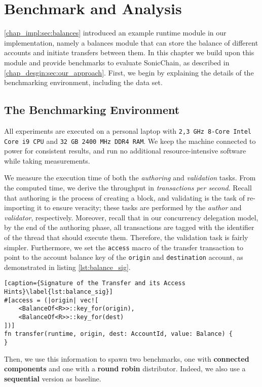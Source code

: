 \chapter{Benchmark and Analysis}  \label{chap:bench_analysis}

\ref{chap_impl:sec:balances} introduced an example runtime module in our implementation, namely a
balances module that can store the balance of different accounts and initiate transfers between
them. In this chapter we build upon this module and provide benchmarks to evaluate SonicChain, as described in \ref{chap_desgin:sec:our_approach}. First, we begin by explaining the details of the
benchmarking environment, including the data set.

\section{The Benchmarking Environment}

All experiments are executed on a personal laptop with \texttt{2,3 GHz 8-Core Intel Core i9 CPU} and \texttt{32 GB 2400 MHz DDR4
RAM}. We keep the machine connected to power for consistent results, and run no additional
resource-intensive software while taking measurements.

We measure the execution time of both the \textit{authoring} and \textit{validation} tasks. From the
computed time, we derive the throughput in \textit{transactions per second}. Recall that authoring
is the process of creating a block, and validating is the task of re-importing it to ensure veracity; these tasks 
are performed by the \textit{author} and \textit{validator}, respectively. Moreover, recall that in our
concurrency delegation model, by the end of the authoring phase, all transactions are tagged with the
identifier of the thread that should execute them. Therefore, the validation task is fairly simpler.
Furthermore, we set the \texttt{access} macro of the transfer transaction to point to the account
balance key of the \texttt{origin} and \texttt{destination} account, as demonstrated in listing
\ref{lst:balance_sig}.

\begin{lstlisting}[caption={Signature of the Transfer and its Access Hints}\label{lst:balance_sig}]
#[access = (|origin| vec![
	<BalanceOf<R>>::key_for(origin),
	<BalanceOf<R>>::key_for(dest)
])]
fn transfer(runtime, origin, dest: AccountId, value: Balance) {
}
\end{lstlisting}

Then, we use this information to spawn two benchmarks, one with \textbf{connected components} and
one with a \textbf{round robin} distributor. Indeed, we also use a \textbf{sequential} version as
baseline.

